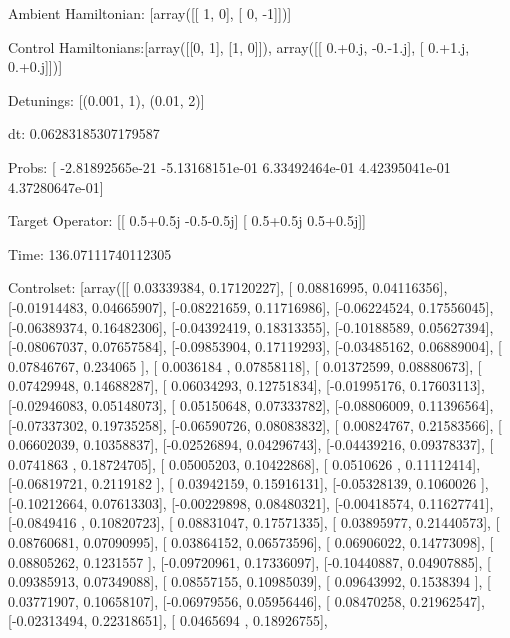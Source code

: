 \documentclass{article}
\begin{document}
    

\newpage

Ambient Hamiltonian: [array([[ 1,  0],
       [ 0, -1]])]

Control Hamiltonians:[array([[0, 1],
       [1, 0]]), array([[ 0.+0.j, -0.-1.j],
       [ 0.+1.j,  0.+0.j]])]

Detunings: [(0.001, 1), (0.01, 2)]

 dt: 0.06283185307179587

Probs: [ -2.81892565e-21  -5.13168151e-01   6.33492464e-01   4.42395041e-01
   4.37280647e-01]

Target Operator: [[ 0.5+0.5j -0.5-0.5j]
 [ 0.5+0.5j  0.5+0.5j]]

Time: 136.07111740112305

Controlset: [array([[ 0.03339384,  0.17120227],
       [ 0.08816995,  0.04116356],
       [-0.01914483,  0.04665907],
       [-0.08221659,  0.11716986],
       [-0.06224524,  0.17556045],
       [-0.06389374,  0.16482306],
       [-0.04392419,  0.18313355],
       [-0.10188589,  0.05627394],
       [-0.08067037,  0.07657584],
       [-0.09853904,  0.17119293],
       [-0.03485162,  0.06889004],
       [ 0.07846767,  0.234065  ],
       [ 0.0036184 ,  0.07858118],
       [ 0.01372599,  0.08880673],
       [ 0.07429948,  0.14688287],
       [ 0.06034293,  0.12751834],
       [-0.01995176,  0.17603113],
       [-0.02946083,  0.05148073],
       [ 0.05150648,  0.07333782],
       [-0.08806009,  0.11396564],
       [-0.07337302,  0.19735258],
       [-0.06590726,  0.08083832],
       [ 0.00824767,  0.21583566],
       [ 0.06602039,  0.10358837],
       [-0.02526894,  0.04296743],
       [-0.04439216,  0.09378337],
       [ 0.0741863 ,  0.18724705],
       [ 0.05005203,  0.10422868],
       [ 0.0510626 ,  0.11112414],
       [-0.06819721,  0.2119182 ],
       [ 0.03942159,  0.15916131],
       [-0.05328139,  0.1060026 ],
       [-0.10212664,  0.07613303],
       [-0.00229898,  0.08480321],
       [-0.00418574,  0.11627741],
       [-0.0849416 ,  0.10820723],
       [ 0.08831047,  0.17571335],
       [ 0.03895977,  0.21440573],
       [ 0.08760681,  0.07090995],
       [ 0.03864152,  0.06573596],
       [ 0.06906022,  0.14773098],
       [ 0.08805262,  0.1231557 ],
       [-0.09720961,  0.17336097],
       [-0.10440887,  0.04907885],
       [ 0.09385913,  0.07349088],
       [ 0.08557155,  0.10985039],
       [ 0.09643992,  0.1538394 ],
       [ 0.03771907,  0.10658107],
       [-0.06979556,  0.05956446],
       [ 0.08470258,  0.21962547],
       [-0.02313494,  0.22318651],
       [ 0.0465694 ,  0.18926755],
\end{document}
